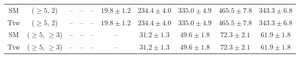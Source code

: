\begin{table}[h!]
{\begin{tabular}{cccccccccc}
	SM & ($\ge5$, 2) & -- & -- & -- & $19.8\pm 1.2$ & $234.4\pm 4.0$ & $335.0\pm 4.9$ & $465.5\pm 7.8$ & $343.3\pm 6.8$ \\[0.5ex] 
	Ttw & ($\ge5$, 2) & -- & -- & -- & $19.8\pm 1.2$ & $234.4\pm 4.0$ & $335.0\pm 4.9$ & $465.5\pm 7.8$ & $343.3\pm 6.8$ \\[0.5ex] 
	SM & ($\ge5$, $\ge3$) & -- & -- & -- & -- & $31.2\pm 1.3$ & $49.6\pm 1.8$ & $72.3\pm 2.1$ & $61.9\pm 1.8$ \\[0.5ex] 
	Ttw & ($\ge5$, $\ge3$) & -- & -- & -- & -- & $31.2\pm 1.3$ & $49.6\pm 1.8$ & $72.3\pm 2.1$ & $61.9\pm 1.8$ \\[0.5ex] 
	\hline
	\hline
\end{tabular}}
\end{table}
